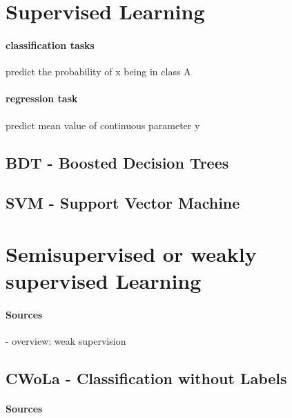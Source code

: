 \section{Supervised Learning}
\paragraph{classification tasks} predict the probability of x being in class A
\paragraph{regression task} predict mean value of continuous parameter y

\subsection{BDT - Boosted Decision Trees}

\subsection{SVM - Support Vector Machine}



\section{Semisupervised or weakly supervised Learning}

\paragraph{Sources}
- overview: weak supervision

\subsection{CWoLa - Classification without Labels}
\paragraph{Sources}


